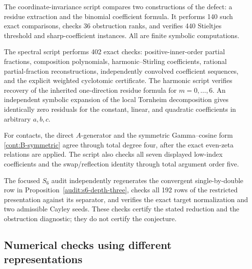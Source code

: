 \documentclass[11pt,a4paper]{article}
\theoremstyle{definition}
\theoremstyle{remark}
\numberwithin{equation}{section}
\begin{document}
The coordinate-invariance script compares two constructions of the
defect: a residue extraction and the binomial coefficient formula.
It performs 140 such exact comparisons, checks 36 obstruction ranks,
and verifies 440 Stieltjes threshold and sharp-coefficient instances.
All are finite symbolic computations.

The spectral script performs 402 exact checks: positive-inner-order
partial fractions, composition polynomials, harmonic--Stirling
coefficients, rational partial-fraction reconstructions, independently
convolved coefficient sequences, and the explicit weighted
cyclotomic certificate. The harmonic script verifies recovery of
the inherited one-direction residue formula for $m=0,\ldots,6$.
An independent symbolic expansion of the local Tornheim
decomposition gives identically zero residuals for the constant,
linear, and quadratic coefficients in arbitrary $a,b,c$.

For contacts, the direct $A$-generator and the symmetric
Gamma--cosine form \eqref{cont:B-symmetric} agree through total degree
four, after the exact even-zeta relations are applied. The script
also checks all seven displayed low-index coefficients and the
swap/reflection identity through total argument order five.

The focused $S_6$ audit independently regenerates the convergent
single-by-double row in Proposition~\ref{audit:s6-depth-three}, checks
all 192 rows of the restricted presentation against its separator,
and verifies the exact target normalization and two admissible
Cayley seeds. These checks certify the stated reduction and the
obstruction diagnostic; they do not certify the conjecture.

\subsection{Numerical checks using different representations}
\end{document}
